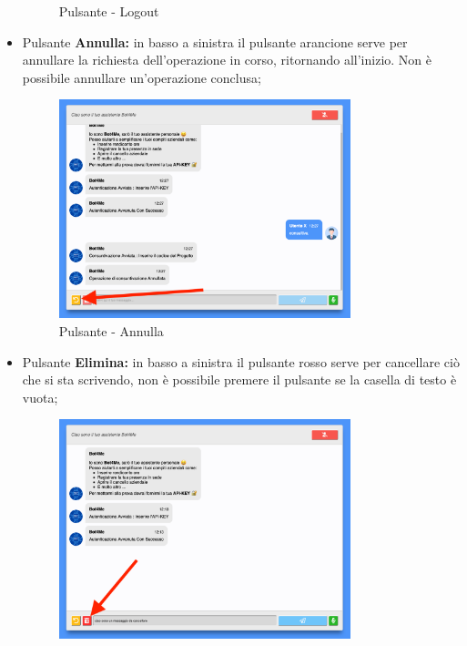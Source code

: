 \begin{itemize}
\begin{figure}[H]
            \caption{Pulsante - Logout}
        \end{figure}
    \item Pulsante \textbf{Annulla:} in basso a sinistra il pulsante arancione serve per annullare la richiesta dell'operazione in corso, ritornando all'inizio. Non è possibile annullare un'operazione conclusa;
        \begin{figure}[H]
            \centering\includegraphics[width=0.8\textwidth, height=0.7\textheight, keepaspectratio]{images/schermata_pulsante_annulla.png}
            \caption{Pulsante - Annulla}
        \end{figure}
\newpage
    \item Pulsante \textbf{Elimina:} in basso a sinistra il pulsante rosso serve per cancellare ciò che si sta scrivendo, non è possibile premere il pulsante se la casella di testo è vuota;
        \begin{figure}[H]
            \centering\includegraphics[width=0.8\textwidth, height=0.7\textheight, keepaspectratio]{images/schermata_pulsante_cancella.png}

\end{figure}
\end{itemize}
